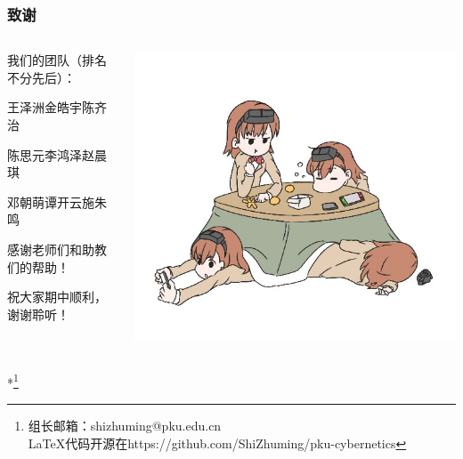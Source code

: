 \documentclass[12pt,AutoFakeBold,aspectratio=43,mathserif]{beamer}
\begin{document}
    \begin{frame}
        \frametitle{致谢}
        \begin{columns}
            \begin{column}{.5\linewidth}
                我们的团队（排名不分先后）：

                王泽洲\quad 金皓宇\quad 陈齐治
        
                陈思元\quad 李鸿泽\quad 赵晨琪
                
                邓朝萌\quad 谭开云\quad 施朱鸣
            
                \bigskip

                感谢老师们和助教们的帮助！

                祝大家期中顺利，谢谢聆听！
            \end{column}
            \begin{column}{.5\linewidth}
                \includegraphics[width=.4\paperwidth]{figures/misaka558.jpg}
            \end{column}
        \end{columns}
        *\footnote{组长邮箱：shizhuming@pku.edu.cn \\ LaTeX代码开源在https://github.com/ShiZhuming/pku-cybernetics}
    \end{frame}
    
\end{document}
